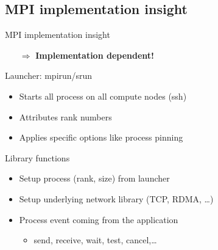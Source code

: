 \documentclass[aspectratio=43]{beamer}
\begin{document}
\subsection{MPI implementation insight}
\begin{frame}{MPI implementation insight}
\begin{itemize}
    \item[\color{cscsred}$\Rightarrow$]\textbf{\color{cscsred}Implementation dependent!}
\end{itemize}

\begin{blue1block}{Launcher: mpirun/srun}
\begin{itemize}
    \item Starts all process on all compute nodes (ssh)
    \item Attributes rank numbers 
    \item Applies specific options like process pinning
\end{itemize}
\end{blue1block}

\begin{blue1block}{Library functions}
\begin{itemize}
    \item Setup process (rank, size) from launcher 
    \item Setup underlying network library (TCP, RDMA, \ldots)
    \item Process event coming from the application
        \begin{itemize}
        \item send, receive, wait, test, cancel,\ldots
        \end{itemize}
\end{itemize}
\end{blue1block}

\end{frame}
\end{document}
